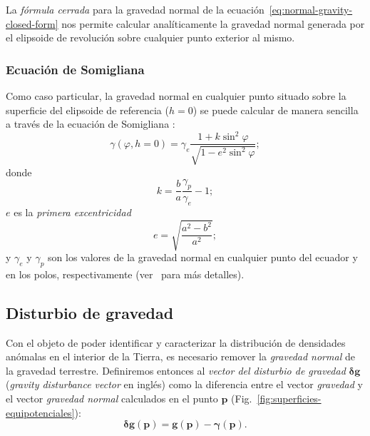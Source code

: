 La \emph{fórmula cerrada} para la gravedad normal de la
ecuación~\ref{eq:normal-gravity-closed-form} nos permite calcular
analíticamente la gravedad normal generada por el elipsoide de revolución sobre
cualquier punto exterior al mismo.

\subsubsection{Ecuación de Somigliana}

Como caso particular, la gravedad normal en cualquier punto situado sobre la
superficie del elipsoide de referencia ($h=0$) se puede calcular de manera
sencilla a través de la ecuación de Somigliana \citep{heiskanen1967}:
%
\begin{equation}
    \gamma(\varphi, h=0) =
        \gamma_e
        \frac{1 + k \sin^2\varphi}{\sqrt{1 - e^2 \sin^2\varphi}};
    \label{eq:somigliana}
\end{equation}
%
donde
%
\begin{equation}
    k = \frac{b}{a} \frac{\gamma_p}{\gamma_e} - 1;
\end{equation}
%
$e$ es la \emph{primera excentricidad}
%
\begin{equation}
    e = \sqrt{\frac{a^2 - b^2}{a^2}};
\end{equation}
%
y $\gamma_e$ y $\gamma_p$ son los valores de la gravedad normal en
cualquier punto del ecuador y en los polos, respectivamente
(ver~\citealp[][p.~68--69,]{heiskanen1967} para más detalles).


\subsection{Disturbio de gravedad}

Con el objeto de poder identificar y caracterizar la distribución de densidades
anómalas en el interior de la Tierra, es necesario remover la \emph{gravedad
normal} de la gravedad terrestre.
Definiremos entonces al \emph{vector del disturbio de gravedad}
$\boldsymbol\delta \mathbf{g}$ (\emph{gravity disturbance vector} en inglés)
como la diferencia entre el vector \emph{gravedad} y el vector \emph{gravedad
normal} calculados en el punto $\mathbf{p}$
(Fig.~\ref{fig:superficies-equipotenciales}):
%
\begin{equation}
    \boldsymbol\delta \mathbf{g}(\mathbf{p}) =
        \mathbf{g}(\mathbf{p}) - \boldsymbol\gamma(\mathbf{p}).
    \label{eq:gravity-disturbance-vector}
\end{equation}

